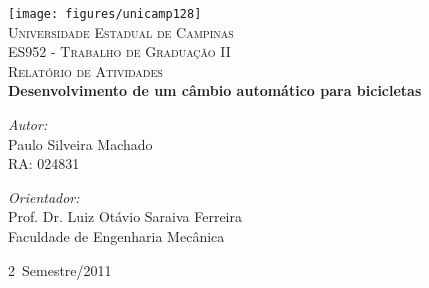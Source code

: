 %
%
%
% 
% 
%
\begin{titlepage}
\begin{center}
 
\texttt{[image: figures/unicamp128]}\\[1cm]
\textsc{\LARGE Universidade Estadual de Campinas}\\[0.3cm]
\textsc{\LARGE ES952 - Trabalho de Graduação II}\\[3.0cm] 
\textsc{\Large Relatório de Atividades} \\[0.2cm]

  
\hfill
\textsf{ \LARGE \bfseries Desenvolvimento de um câmbio automático para
bicicletas}

\vfill
\begin{minipage}{0.49\textwidth}
\begin{flushleft} \large
\emph{Autor:}\\
Paulo Silveira Machado \\
RA: 024831
\end{flushleft}
\end{minipage}
\begin{minipage}{0.5\textwidth}
\begin{flushright} \large
\emph{Orientador:} \\
Prof. Dr. Luiz Otávio Saraiva Ferreira\\
Faculdade de Engenharia Mecânica
\end{flushright}
\end{minipage}
 
\vfill
 
{\large 2\textordmasculine ~Semestre/2011}
\end{center}
 
\end{titlepage}

\tableofcontents
\pagebreak

\listoffigures
\pagebreak

\listoftables
\pagebreak
